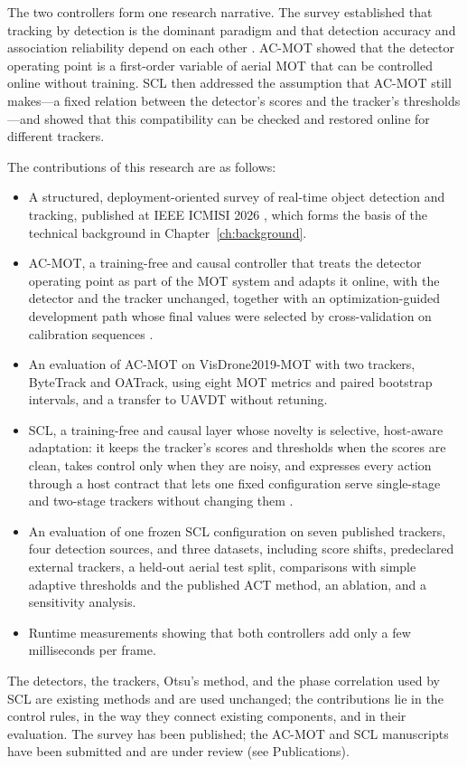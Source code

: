 The two controllers form one research narrative. The survey established that tracking by detection is the dominant paradigm and that detection accuracy and association reliability depend on each other \cite{ismail2026realtime}. AC-MOT showed that the detector operating point is a first-order variable of aerial MOT that can be controlled online without training. SCL then addressed the assumption that AC-MOT still makes---a fixed relation between the detector's scores and the tracker's thresholds---and showed that this compatibility can be checked and restored online for different trackers.

The contributions of this research are as follows:
\begin{itemize}
\item A structured, deployment-oriented survey of real-time object detection and tracking, published at IEEE ICMISI 2026 \cite{ismail2026realtime}, which forms the basis of the technical background in Chapter~\ref{ch:background}.
\item AC-MOT, a training-free and causal controller that treats the detector operating point as part of the MOT system and adapts it online, with the detector and the tracker unchanged, together with an optimization-guided development path whose final values were selected by cross-validation on calibration sequences \cite{ismail2026acmot}.
\item An evaluation of AC-MOT on VisDrone2019-MOT with two trackers, ByteTrack and OATrack, using eight MOT metrics and paired bootstrap intervals, and a transfer to UAVDT without retuning.
\item SCL, a training-free and causal layer whose novelty is selective, host-aware adaptation: it keeps the tracker's scores and thresholds when the scores are clean, takes control only when they are noisy, and expresses every action through a host contract that lets one fixed configuration serve single-stage and two-stage trackers without changing them \cite{ismail2026scl}.
\item An evaluation of one frozen SCL configuration on seven published trackers, four detection sources, and three datasets, including score shifts, predeclared external trackers, a held-out aerial test split, comparisons with simple adaptive thresholds and the published ACT method, an ablation, and a sensitivity analysis.
\item Runtime measurements showing that both controllers add only a few milliseconds per frame.
\end{itemize}
The detectors, the trackers, Otsu's method, and the phase correlation used by SCL are existing methods and are used unchanged; the contributions lie in the control rules, in the way they connect existing components, and in their evaluation. The survey has been published; the AC-MOT and SCL manuscripts have been submitted and are under review (see Publications).

